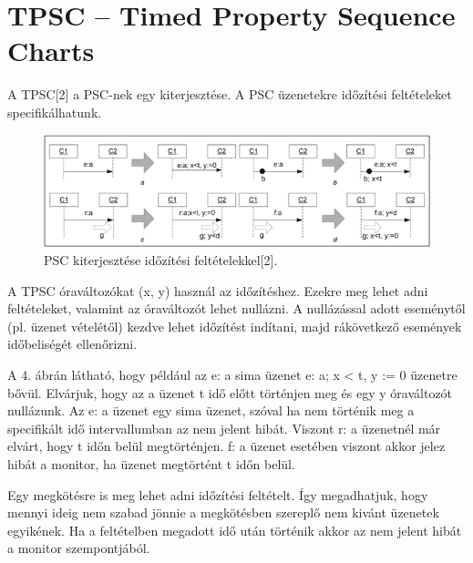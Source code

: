 \chapter{TPSC – Timed Property Sequence Charts}
A TPSC[2] a PSC-nek egy kiterjesztése. A PSC üzenetekre időzítési feltételeket specifikálhatunk.

\begin{figure}[!ht]
    \centering
    \includegraphics[width=150mm, keepaspectratio]{figures/4abra.png}
    \caption{PSC kiterjesztése időzítési feltételekkel[2].}
\end{figure}

A TPSC óraváltozókat (x, y) használ az időzítéshez. Ezekre meg lehet adni feltételeket, valamint az óraváltozót lehet nullázni. A nullázással adott eseménytől (pl. üzenet vételétől) kezdve lehet időzítést indítani, majd rákövetkező események időbeliségét ellenőrizni.

A 4. ábrán látható, hogy például az e: a sima üzenet e: a; x < t, y := 0 üzenetre bővül. Elvárjuk, hogy az a üzenet t idő előtt történjen meg és egy y óraváltozót nullázunk. Az e: a üzenet egy sima üzenet, szóval ha nem történik meg a specifikált idő intervallumban az nem jelent hibát. Viszont r: a üzenetnél már elvárt, hogy t időn belül megtörténjen. f: a üzenet esetében viszont akkor jelez hibát a monitor, ha üzenet megtörtént t időn belül.

Egy megkötésre is meg lehet adni időzítési feltételt. Így megadhatjuk, hogy mennyi ideig nem szabad jönnie a megkötésben szereplő nem kivánt üzenetek egyikének. Ha a feltételben megadott idő után történik akkor az nem jelent hibát a monitor szempontjából.
